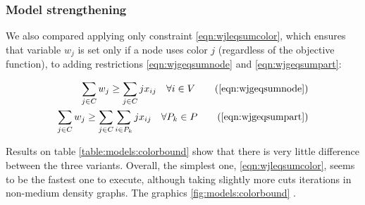 \subsubsection{Model strengthening}

We also compared applying only constraint \ref{eqn:wjleqsumcolor}, which ensures that variable $w_j$ is set only if a node uses color $j$ (regardless of the objective function), to adding restrictions \ref{eqn:wjgeqsumnode} and \ref{eqn:wjgeqsumpart}:

\begin{align*}
\sum_{j \in C} w_j \geq \sum_{j \in C} j x_{ij} \quad \forall i \in V \tag{\ref{eqn:wjgeqsumnode}} \\
\sum_{j \in C} w_j \geq \sum_{j \in C} \sum_{i \in P_k} j x_{ij} \quad \forall P_k \in P \tag{\ref{eqn:wjgeqsumpart}}
\end{align*}

Results on table \ref{table:models:colorbound} show that there is very little difference between the three variants. Overall, the simplest one, \ref{eqn:wjleqsumcolor}, seems to be the fastest one to execute, although taking slightly more cuts iterations in non-medium density graphs. The graphics \ref{fig:models:colorbound} .


